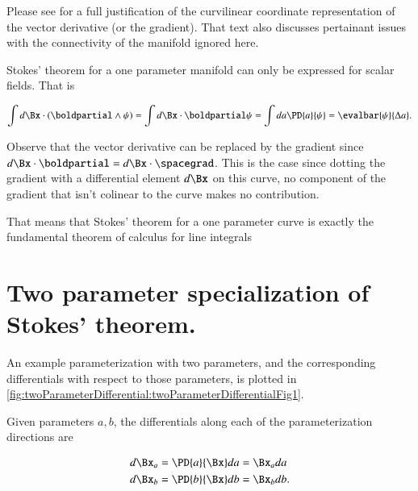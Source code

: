 Please see \citep{aMacdonaldVAGC} for a full justification of the curvilinear coordinate representation of the vector derivative (or the gradient).  That text also discusses pertainant issues with the connectivity of the manifold ignored here.

Stokes' theorem for a one parameter manifold can only be expressed for scalar fields.  That is

\begin{dmath}\label{eqn:stokesTheoremCore:60}
\int d\Bx \cdot (\boldpartial \wedge \psi)
=
\int d\Bx \cdot \boldpartial \psi
=
\int da \PD{a}{ \psi }
= \evalbar{\psi}{\Delta a}.
\end{dmath}

Observe that the vector derivative can be replaced by the gradient since \( d\Bx \cdot \boldpartial = d\Bx \cdot \spacegrad \).
This is the case since dotting the
gradient with a differential element \( d\Bx \) on this curve, no component of the gradient that isn't colinear to the curve makes no contribution.

That means that Stokes' theorem for a one parameter curve is exactly the fundamental theorem of calculus for line integrals


\section{Two parameter specialization of Stokes' theorem.}

An example parameterization with two parameters, and the corresponding differentials with respect to those parameters, is plotted in
\cref{fig:twoParameterDifferential:twoParameterDifferentialFig1}.


Given parameters \( a, b \), the differentials along each of the parameterization directions are

\begin{dmath}\label{eqn:stokesTheoremCore:100}
\begin{aligned}
d\Bx_a &= \PD{a}{\Bx} da = \Bx_a da \\
d\Bx_b &= \PD{b}{\Bx} db = \Bx_b db.
\end{aligned}
\end{dmath}

